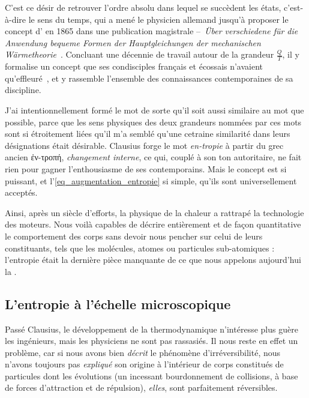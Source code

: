 		C’est ce désir de retrouver l’ordre absolu dans lequel se succèdent les états, c’est-à-dire le sens du temps, qui a mené le physicien allemand  jusqu’à proposer le concept d’ en 1865 dans une publication magistrale --\ \textit{Über verschiedene für die Anwendung bequeme Formen der Hauptgleichungen der mechanischen Wärmetheorie}~\cite{clausius1865,clausius1867en,clausius1868fr2}. Concluant une décennie de travail autour de la grandeur $\frac{Q}{T}$, il y formalise un concept que ses condisciples français  et écossais  n’avaient qu’effleuré~\cite{truesdell1980}, et y rassemble l’ensemble des connaissances contemporaines de sa discipline.
		
			J’ai intentionnellement formé le mot  de sorte qu’il soit aussi similaire au mot  que possible, parce que les sens physiques des deux grandeurs nommées par ces mots sont si étroitement liées qu’il m’a semblé qu’une cetraine similarité dans leurs désignations était désirable.
		Clausius forge le mot \textit{en-tropie} à partir du grec ancien \textgreek{ἐν-τροπή}, \textit{changement interne}, ce qui, couplé à son ton autoritaire, ne fait rien pour gagner l’enthousiasme de ses contemporains. Mais le concept est si puissant, et l’\cref{eq_augmentation_entropie} si simple, qu’ils sont universellement acceptés.
		
		Ainsi, après un siècle d’efforts, la physique de la chaleur a rattrapé la technologie des moteurs. Nous voilà capables de décrire entièrement et de façon quantitative le comportement des corps sans devoir nous pencher sur celui de leurs constituants, tels que les molécules, atomes ou particules sub-atomiques : l’entropie était la dernière pièce manquante de ce que nous appelons aujourd’hui la .
		
		
	\subsection{L’entropie à l’échelle microscopique}
	\label{ch_entropie_boltzmann}
	
		Passé Clausius, le développement de la thermodynamique n’intéresse plus guère les ingénieurs, mais les physiciens ne sont pas rassasiés. Il nous reste en effet un problème, car si nous avons bien \emph{décrit} le phénomène d’irréversibilité, nous n’avons toujours pas \emph{expliqué} son origine à l’intérieur de corps constitués de particules dont les évolutions (un incessant bourdonnement de collisions, à base de forces d’attraction et de répulsion), \emph{elles}, sont parfaitement réversibles.
		
